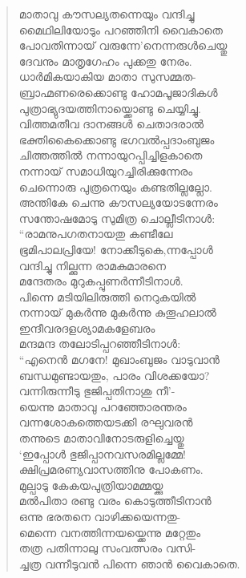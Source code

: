 \begin{verse}
മാതാവു കൗസല്യതന്നെയും വന്ദിച്ചു\\
മൈഥിലിയോടും പറഞ്ഞിനി വൈകാതെ\\
പോവതിന്നായ് വരുന്നേ’നെന്നരുള്‍ചെയ്തു\\
ദേവനും മാതൃഗേഹം പുക്കതു നേരം.\\
ധാര്‍മികയാകിയ മാതാ സുസമ്മത-\\
ബ്രാഹ്മണരെക്കൊണ്ടു ഹോമപൂജാദികള്‍\\
പുത്രാഭ്യുദയത്തിനായ്ക്കൊണ്ടു ചെയ്യിച്ചു.\\
വിത്തമതീവ ദാനങ്ങള്‍ ചെതാദരാല്‍\\
ഭക്തികൈക്കൊണ്ടു ഭഗവല്‍പ്പദാംബുജം\\
ചിത്തത്തില്‍ നന്നായുറപ്പിച്ചിളകാതെ\\
നന്നായ് സമാധിയുറച്ചിരിക്കുന്നേരം\\
ചെന്നൊരു പുത്രനെയും കണ്ടതില്ലല്ലോ.\\
അന്തികേ ചെന്നു കൗസല്യയോടന്നേരം\\
സന്തോഷമോടു സുമിത്ര ചൊല്ലീടിനാള്‍:\\
“രാമനുപഗതനായതു കണ്ടീലേ\\
ഭൂമിപാലപ്രിയേ! നോക്കീടുകെ,ന്നപ്പോള്‍\\
വന്ദിച്ചു നില്ക്കുന്ന രാമകുമാരനെ\\
മന്ദേതരം മുറുകപ്പുണര്‍ന്നീടിനാള്‍.\\
പിന്നെ മടിയിലിരുത്തി നെറുകയില്‍\\
നന്നായ് മുകര്‍ന്നു മുകര്‍ന്നു കുതൂഹലാല്‍\\
ഇന്ദീവരദളശ്യാമകളേബരം\\
മന്ദമന്ദ തലോടിപ്പറഞ്ഞീടിനാള്‍:\\
“എനെന്‍ മഗനേ! മുഖാംബുജം വാടുവാന്‍\\
ബന്ധമുണ്ടായതും, പാരം വിശക്കയോ?\\
വന്നിരുന്നീടു ഭുജിപ്പതിനാശു നീ’-\\
യെന്നു മാതാവു പറഞ്ഞോരന്തരം\\
വന്നശോകത്തെയടക്കി രഘുവരന്‍\\
തന്നുടെ മാതാവിനോടരുളിച്ചെയ്തു\\
‘ഇപ്പോള്‍ ഭുജിപ്പാനവസരമില്ലമ്മേ!\\
ക്ഷിപ്രമരണ്യവാസത്തിനു പോകണം.\\
മുല്പാടു കേകയപുത്രിയാമമ്മയ്ക്കു\\
മല്‍പിതാ രണ്ടു വരം കൊടുത്തീടിനാന്‍\\
ഒന്നു ഭരതനെ വാഴിക്കയെന്നതു-\\
മെന്നെ വനത്തിന്നയയ്ക്കെന്നു മറ്റേതും\\
തത്ര പതിന്നാലു സംവത്സരം വസി-\\
ച്ചത്ര വന്നീടുവന്‍ പിന്നെ ഞാന്‍ വൈകാതെ.\\

\end{verse}
